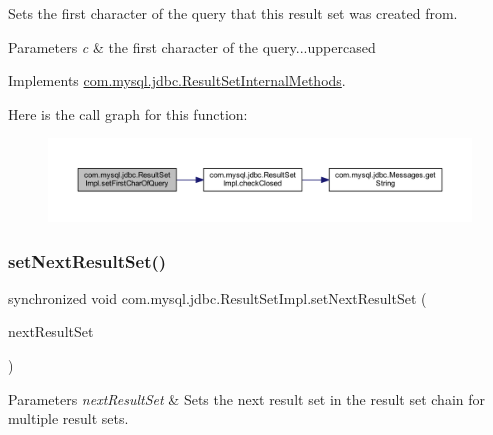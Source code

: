 Sets the first character of the query that this result set was created from.


\begin{DoxyParams}{Parameters}
{\em c} & the first character of the query...uppercased \\
\hline
\end{DoxyParams}


Implements \mbox{\hyperlink{interfacecom_1_1mysql_1_1jdbc_1_1_result_set_internal_methods_ab6ec147add453fc1d02e0704953a303a}{com.\+mysql.\+jdbc.\+Result\+Set\+Internal\+Methods}}.

Here is the call graph for this function\+:
\nopagebreak
\begin{figure}[H]
\begin{center}
\leavevmode
\includegraphics[width=350pt]{classcom_1_1mysql_1_1jdbc_1_1_result_set_impl_af4fe74c27ee2030bc12bc629f57f944f_cgraph}
\end{center}
\end{figure}
\mbox{\label{classcom_1_1mysql_1_1jdbc_1_1_result_set_impl_ae5fc728dc78b34a04ff5314f8afcb119}} 
\subsubsection{\texorpdfstring{set\+Next\+Result\+Set()}{setNextResultSet()}}
{\footnotesize\ttfamily synchronized void com.\+mysql.\+jdbc.\+Result\+Set\+Impl.\+set\+Next\+Result\+Set (\begin{DoxyParamCaption}\item[{\mbox{\hyperlink{interfacecom_1_1mysql_1_1jdbc_1_1_result_set_internal_methods}{Result\+Set\+Internal\+Methods}}}]{next\+Result\+Set }\end{DoxyParamCaption})\hspace{0.3cm}{\ttfamily [protected]}}


\begin{DoxyParams}{Parameters}
{\em next\+Result\+Set} & Sets the next result set in the result set chain for multiple result sets. \\
\hline
\end{DoxyParams}
\mbox{\label{classcom_1_1mysql_1_1jdbc_1_1_result_set_impl_ac318c564fa48174a78268750b91bac73}} 
